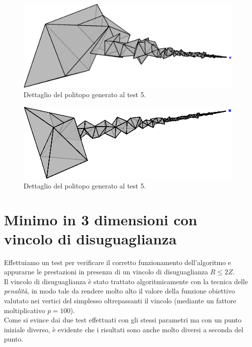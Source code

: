 \documentclass[a4paper, 11pt]{article}
\begin{document}
\begin{figure}[H]
    \centering
        \includegraphics[width=14cm]{assets/figure5}
        \caption{Dettaglio del politopo generato al test 5.}
\end{figure}
\noindent 

\begin{figure}[H]
    \centering
        \includegraphics[width=14cm]{assets/figure6}
        \caption{Dettaglio del politopo generato al test 5.}
\end{figure}
\noindent

\newpage
\section{Minimo in 3 dimensioni con vincolo di disuguaglianza}

Effettuiamo un test per verificare il corretto funzionamento dell'algoritmo e
appurarne le prestazioni in presenza di un vincolo di disuguaglianza $R \le 2Z$.
\\
Il vincolo di disuguaglianza è stato trattato algoritmicamente con la tecnica
delle \emph{penalità}, in modo tale da rendere molto alto il valore della
funzione obiettivo valutato nei vertici del simplesso oltrepassanti il vincolo
(mediante un fattore moltiplicativo $p = 100$). \\
Come si evince dai due test effettuati con gli stessi parametri ma con un punto
iniziale diverso, è evidente che i risultati sono anche molto diversi a seconda
del punto.
\end{document}
